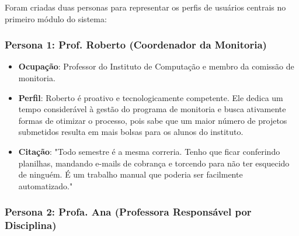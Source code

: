 \documentclass[12pt, a4paper]{report}
\begin{document}
Foram criadas duas personas para representar os perfis de usuários centrais no primeiro módulo do sistema:

\subsubsection{Persona 1: Prof. Roberto (Coordenador da Monitoria)}

\begin{center}
\end{center}

\vspace{0.5cm}

\begin{itemize}
    \item \textbf{Ocupação}: Professor do Instituto de Computação e membro da comissão de monitoria.
    \item \textbf{Perfil}: Roberto é proativo e tecnologicamente competente. Ele dedica um tempo considerável à gestão do programa de monitoria e busca ativamente formas de otimizar o processo, pois sabe que um maior número de projetos submetidos resulta em mais bolsas para os alunos do instituto.
    \item \textbf{Citação}: "Todo semestre é a mesma correria. Tenho que ficar conferindo planilhas, mandando e-mails de cobrança e torcendo para não ter esquecido de ninguém. É um trabalho manual que poderia ser facilmente automatizado."
\end{itemize}

\subsubsection{Persona 2: Profa. Ana (Professora Responsável por Disciplina)}
\end{document}
